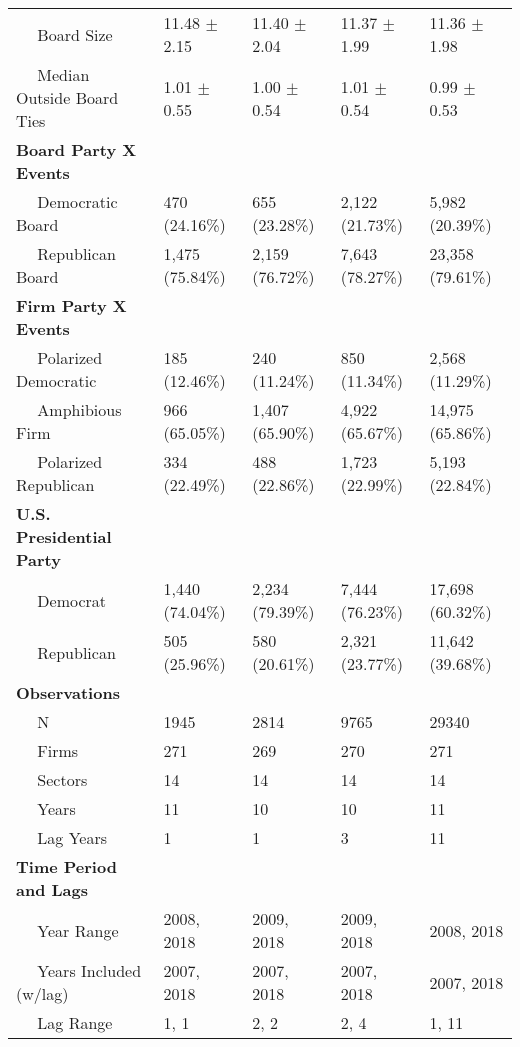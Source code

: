 \begin{tabular}{lllll}
~~ Board Size & 11.48 $\pm$ 2.15 & 11.40 $\pm$ 2.04 & 11.37 $\pm$ 1.99 & 11.36 $\pm$ 1.98\\
~~ Median Outside Board Ties & 1.01 $\pm$ 0.55 & 1.00 $\pm$ 0.54 & 1.01 $\pm$ 0.54 & 0.99 $\pm$ 0.53\\
\bf{Board Party X Events} & ~ & ~ & ~ & ~\\
~~ Democratic Board & 470 (24.16\%) & 655 (23.28\%) & 2,122 (21.73\%) & 5,982 (20.39\%)\\
\addlinespace
~~ Republican Board & 1,475 (75.84\%) & 2,159 (76.72\%) & 7,643 (78.27\%) & 23,358 (79.61\%)\\
\bf{Firm Party X Events} & ~ & ~ & ~ & ~\\
~~ Polarized Democratic & 185 (12.46\%) & 240 (11.24\%) & 850 (11.34\%) & 2,568 (11.29\%)\\
~~ Amphibious Firm & 966 (65.05\%) & 1,407 (65.90\%) & 4,922 (65.67\%) & 14,975 (65.86\%)\\
~~ Polarized Republican & 334 (22.49\%) & 488 (22.86\%) & 1,723 (22.99\%) & 5,193 (22.84\%)\\
\addlinespace
\bf{U.S. Presidential Party} & ~ & ~ & ~ & ~\\
~~ Democrat & 1,440 (74.04\%) & 2,234 (79.39\%) & 7,444 (76.23\%) & 17,698 (60.32\%)\\
~~ Republican & 505 (25.96\%) & 580 (20.61\%) & 2,321 (23.77\%) & 11,642 (39.68\%)\\
\bf{Observations} & ~ & ~ & ~ & ~\\
~~ N & 1945 & 2814 & 9765 & 29340\\
\addlinespace
~~ Firms & 271 & 269 & 270 & 271\\
~~ Sectors & 14 & 14 & 14 & 14\\
~~ Years & 11 & 10 & 10 & 11\\
~~ Lag Years & 1 & 1 & 3 & 11\\
\bf{Time Period and Lags} & ~ & ~ & ~ & ~\\
\addlinespace
~~ Year Range & 2008, 2018 & 2009, 2018 & 2009, 2018 & 2008, 2018\\
~~ Years Included (w/lag) & 2007, 2018 & 2007, 2018 & 2007, 2018 & 2007, 2018\\
~~ Lag Range & 1, 1 & 2, 2 & 2, 4 & 1, 11\\
\bottomrule
\end{tabular}
